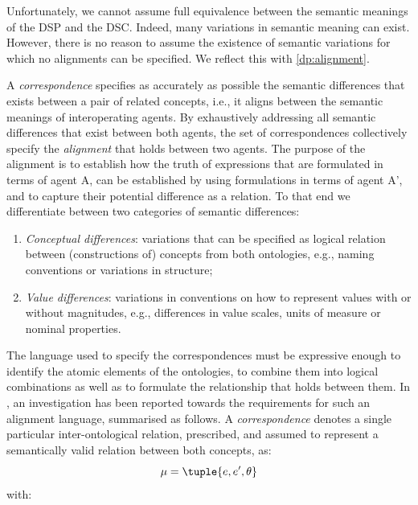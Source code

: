 \documentclass[sort&compress,preprint,authoryear,3p,twocolumn]{elsarticle}
\providecommand{\tightlist}{%
  \setlength{\itemsep}{0pt}\setlength{\parskip}{0pt}}
\begin{document}
Unfortunately, we cannot assume full equivalence between the semantic
meanings of the DSP and the DSC. Indeed, many variations in semantic
meaning can exist. However, there is no reason to assume the existence
of semantic variations for which no alignments can be specified. We
reflect this with \cref{dp:alignment}.

A \emph{correspondence} specifies as accurately as possible the semantic
differences that exists between a pair of related concepts, i.e., it
aligns between the semantic meanings of interoperating agents. By
exhaustively addressing all semantic differences that exist between both
agents, the set of correspondences collectively specify the
\emph{alignment} that holds between two agents. The purpose of the
alignment is to establish how the truth of expressions that are
formulated in terms of agent A, can be established by using formulations
in terms of agent A', and to capture their potential difference as a
relation. To that end we differentiate between two categories of
semantic differences:

\begin{enumerate}
\def\labelenumi{\arabic{enumi}.}
\tightlist
\item
  \emph{Conceptual differences}: variations that can be specified as
  logical relation between (constructions of) concepts from both
  ontologies, e.g., naming conventions or variations in structure;
\item
  \emph{Value differences}: variations in conventions on how to
  represent values with or without magnitudes, e.g., differences in
  value scales, units of measure or nominal properties.
\end{enumerate}

The language used to specify the correspondences must be expressive
enough to identify the atomic elements of the ontologies, to combine
them into logical combinations as well as to formulate the relationship
that holds between them. In \citep{Euzenat2007, Scharffe2011}, an
investigation has been reported towards the requirements for such an
alignment language, summarised as follows. A \emph{correspondence}
denotes a single particular inter-ontological relation, prescribed, and
assumed to represent a semantically valid relation between both
concepts, as: \begin{equation*}\label{eq:correspondence}
\mu = \tuple{ e, e', \theta }
\end{equation*} with:
\end{document}
